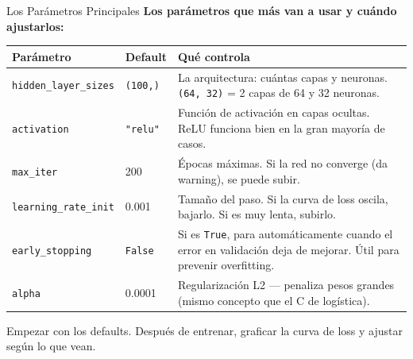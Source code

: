 \documentclass[aspectratio=169, 11pt]{beamer}
\begin{document}
\begin{frame}{Los Par\'ametros Principales}
  \vspace{-4pt}
  {\footnotesize\color{arcaDark}\bfseries
    Los par\'ametros que m\'as van a usar y cu\'ando ajustarlos:}

  \vspace{6pt}
  {\scriptsize
  \begin{tabular}{@{}p{3.8cm}p{2.5cm}p{6cm}@{}}
    \toprule
    \textbf{Par\'ametro} & \textbf{Default} & \textbf{Qu\'e controla} \\
    \midrule
    \texttt{hidden\_layer\_sizes} & \texttt{(100,)} & La arquitectura: cu\'antas capas y neuronas. \texttt{(64, 32)} = 2 capas de 64 y 32 neuronas. \\
    \texttt{activation} & \texttt{"relu"} & Funci\'on de activaci\'on en capas ocultas. ReLU funciona bien en la gran mayor\'ia de casos. \\
    \texttt{max\_iter} & 200 & \'Epocas m\'aximas. Si la red no converge (da warning), se puede subir. \\
    \texttt{learning\_rate\_init} & 0.001 & Tama\~no del paso. Si la curva de loss oscila, bajarlo. Si es muy lenta, subirlo. \\
    \texttt{early\_stopping} & \texttt{False} & Si es \texttt{True}, para autom\'aticamente cuando el error en validaci\'on deja de mejorar. \'Util para prevenir overfitting. \\
    \texttt{alpha} & 0.0001 & Regularizaci\'on L2 --- penaliza pesos grandes (mismo concepto que el C de log\'istica). \\
    \bottomrule
  \end{tabular}
  }

  \vspace{6pt}
  {\scriptsize\color{textMuted}
    \faLightbulb\hspace{4pt} Empezar con los defaults. Despu\'es de entrenar,
    graficar la curva de loss y ajustar seg\'un lo que vean.}
\end{frame}
\end{document}

